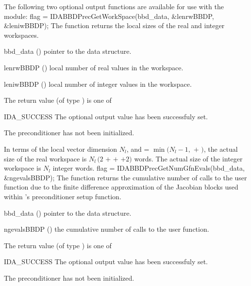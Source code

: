 {%
The following two optional output functions are available for use with
the {\idabbdpre} module:
{
  flag = IDABBDPrecGetWorkSpace(bbd\_data, \&lenrwBBDP, \&leniwBBDP);
}
{
  The function  returns the local sizes
  of the {\idabbdpre} real and integer workspaces.
}
{
  \begin{args}[lenrwBBDP]
  \item[bbd\_data] ()
    pointer to the {\idabbdpre} data structure.
  \item[lenrwBBDP] ()
    local number of real values in the {\idabbdpre} workspace.
  \item[leniwBBDP] ()
    local number of integer values in the {\idabbdpre} workspace.
  \end{args}
}
{
  The return value  (of type ) is one of
  \begin{args}
  \item[IDA\_SUCCESS] 
    The optional output value has been successfuly set.
  \item[\Id{IDA\_PDATA\_NULL}]
    The {\idabbdpre} preconditioner has not been initialized.
  \end{args}
}
{
  In terms of the local vector dimension $N_l$, and
   = $\min ( N_l - 1 ,$  $+$ $)$,
  the actual size of the real workspace is
  $N_l \,(2$  $+$  $+$  $+2)$  words.
  The actual size of the integer workspace is $N_l$ integer words.
}
{
  flag = IDABBDPrecGetNumGfnEvals(bbd\_data, \&ngevalsBBDP);
}
{
  The function  returns the
  cumulative number of calls to the user  function due to the 
  finite difference approximation of the Jacobian blocks used within
  {\idabbdpre}'s preconditioner setup function.
}
{
  \begin{args}[ngevalsBBDP]
  \item[bbd\_data] ()
    pointer to the {\idabbdpre} data structure.
  \item[ngevalsBBDP] ()
    the cumulative number of calls to the user  function.
  \end{args}
}
{
  The return value  (of type ) is one of
  \begin{args}
  \item[IDA\_SUCCESS] 
    The optional output value has been successfuly set.
  \item[\Id{IDA\_PDATA\_NULL}]
    The {\idabbdpre} preconditioner has not been initialized.
  \end{args}
}
{}

}
